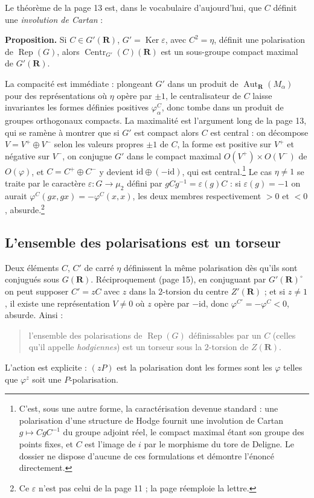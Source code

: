 \documentclass[11pt,a4paper]{article}
\begin{document}
Le théorème de la page 13 est, dans le vocabulaire d'aujourd'hui, que $C$
définit une \emph{involution de Cartan} :

\textbf{Proposition.} Si $C \in G'(\mathbf{R})$, $G' = \operatorname{Ker}
\varepsilon$, avec $C^{2} = \eta$, définit une polarisation de
$\operatorname{Rep}(G)$, alors $\operatorname{Centr}_{G'}(C)(\mathbf{R})$ est
un sous-groupe compact maximal de $G'(\mathbf{R})$.

La compacité est immédiate : plongeant $G'$ dans un produit de
$\operatorname{Aut}_{\mathbf{R}}(M_{\alpha})$ pour des représentations où
$\eta$ opère par $\pm 1$, le centralisateur de $C$ laisse invariantes les
formes définies positives $\varphi^{C}_{\alpha}$, donc tombe dans un produit de
groupes orthogonaux compacts. La maximalité est l'argument long de la page 13,
qui se ramène à montrer que si $G'$ est compact alors $C$ est central : on
décompose $V = V^{+} \oplus V^{-}$ selon les valeurs propres $\pm 1$ de $C$,
la forme est positive sur $V^{+}$ et négative sur $V^{-}$, on conjugue $G'$
dans le compact maximal $O(V^{+}) \times O(V^{-})$ de $O(\varphi)$, et $C =
C^{+} \oplus C^{-}$ y devient $\mathrm{id} \oplus (-\mathrm{id})$, qui est
central.\footnote{C'est, sous une autre forme, la caractérisation devenue
standard : une polarisation d'une structure de Hodge fournit une involution de
Cartan $g \mapsto CgC^{-1}$ du groupe adjoint réel, le compact maximal étant
son groupe des points fixes, et $C$ est l'image de $i$ par le
morphisme du tore de Deligne. Le dossier ne dispose d'aucune de ces
formulations et démontre l'énoncé directement.} Le cas $\eta \neq 1$ se traite
par le caractère $\varepsilon \colon G \to \mu_{2}$ défini par $gCg^{-1} =
\varepsilon(g) C$ : si $\varepsilon(g) = -1$ on aurait
$\varphi^{C}(gx,gx) = -\varphi^{C}(x,x)$, les deux membres respectivement $> 0$
et $< 0$, absurde.\footnote{Ce $\varepsilon$ n'est pas celui de la page 11 ; la
page réemploie la lettre.}

\subsection*{L'ensemble des polarisations est un torseur}

Deux éléments $C$, $C'$ de carré $\eta$ définissent la même polarisation dès
qu'ils sont conjugués sous $G(\mathbf{R})$. Réciproquement (page 15), en
conjuguant par $G'(\mathbf{R})^{\circ}$ on peut supposer $C' = zC$ avec $z$
dans la $2$-torsion du centre $Z'(\mathbf{R})$ ; et si $z \neq 1$, il existe
une représentation $V \neq 0$ où $z$ opère par $-\mathrm{id}$, donc
$\varphi^{C'} = -\varphi^{C} < 0$, absurde. Ainsi :
\begin{quote}
l'ensemble des polarisations de $\operatorname{Rep}(G)$ définissables par un
$C$ (celles qu'il appelle \emph{hodgiennes}) est un torseur sous la
$2$-torsion de $Z(\mathbf{R})$.
\end{quote}
L'action est explicite : $(zP)$ est la polarisation dont les formes sont les
$\varphi$ telles que $\varphi^{z}$ soit une $P$-polarisation.
\end{document}
